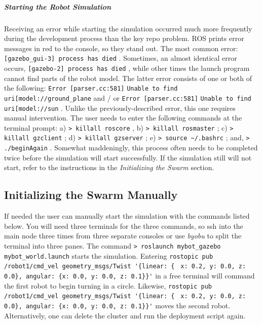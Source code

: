 \documentclass[9pt,twocolumn,twoside]{../../styles/osajnl}
\begin{document}
\subparagraph{Starting the Robot Simulation}
Receiving an error while starting the simulation occurred much more frequently during the development process than the key repo problem.  ROS prints error messages in red to the console, so they stand out.  The most common error: {\color{red} \lstinline[style=BashInputStyle]![gazebo_gui-3] process has died! }.  Sometimes, an almost identical error occurs, {\color{red} \lstinline[style=BashInputStyle]![gazebo-2] process has died! }, while other times the launch program cannot find parts of the robot model.  The latter error consists of one or both of the following: {\color{red} \lstinline[style=BashInputStyle]!Error [parser.cc:581]! }{\lstinline[style=BashInputStyle]!Unable to find uri[model://ground_plane! } and / or {\color{red} \lstinline[style=BashInputStyle]!Error [parser.cc:581]! }{\lstinline[style=BashInputStyle]!Unable to find uri[model://sun! }.  Unlike the previously-described error, this one requires manual intervention.  The user needs to enter the following commands at the terminal prompt: a) {\color{green} \lstinline[style=BashInputStyle]!> killall roscore! }, b) {\color{green} \lstinline[style=BashInputStyle]!> killall rosmaster! }; c) {\color{green} \lstinline[style=BashInputStyle]!> killall gzclient! }; d) {\color{green} \lstinline[style=BashInputStyle]!> killall gzserver! }; e) {\color{green} \lstinline[style=BashInputStyle]!> source ~/.bashrc! }; and, {\color{green} \lstinline[style=BashInputStyle]!> ./beginAgain! }. Somewhat maddeningly, this process often needs to be completed twice before the simulation will start successfully.  If the simulation still will not start, refer to the instructions in the \textit{Initializing the Swarm} section.

\subsection{Initializing the Swarm Manually}
If needed the user can manually start the simulation with the commands listed below.  You will need three terminals for the three commands, so ssh into the main node three times from three separate consoles or use \textit{byobu} to split the terminal into three panes.  The command {\color{green} \lstinline[style=BashInputStyle]!> roslaunch mybot_gazebo mybot_world.launch! } starts the simulation.  Entering {\color{green} \lstinline[style=BashInputStyle]!rostopic pub /robot1/cmd_vel geometry_msgs/Twist '{linear: { !} {\color{green} \lstinline[style=BashInputStyle]!x: 0.2, y: 0.0, z: 0.0}, angular: {x: 0.0, y: 0.0, z: 0.1}}'! } \newline in a free terminal will command the first robot to begin turning in a circle.  Likewise, {\color{green} \lstinline[style=BashInputStyle]!rostopic pub /robot1/cmd_vel geometry_msgs/Twist '{linear: { !} {\color{green} \lstinline[style=BashInputStyle]!x: 0.2, y: 0.0, z: 0.0}, angular: {x: 0.0, y: 0.0, z: 0.1}}'! } \newline moves the second robot. Alternatively, one can delete the cluster and run the deployment script again.
\end{document}

